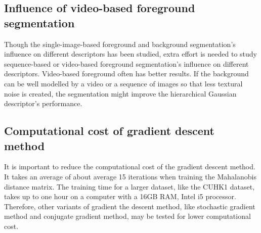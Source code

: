 \subsection{Influence of video-based foreground segmentation}
Though the single-image-based foreground and background segmentation's influence on different descriptors has been studied, extra effort is needed to study sequence-based or video-based foreground segmentation's influence on different descriptors. Video-based foreground often has better results. If the background can be well modelled by a video or a sequence of images so that less textural noise is created, the segmentation might improve the hierarchical Gaussian descriptor's performance.
\subsection{Computational cost of gradient descent method}
It is important to reduce the computational cost of the gradient descent method. It takes an average of about average 15 iterations when training the Mahalanobis distance matrix. The training time for a larger dataset, like the CUHK1 dataset, takes up to one hour on a computer with a 16GB RAM, Intel i5 processor. Therefore, other variants of gradient the descent method, like stochastic gradient method and conjugate gradient method, may be tested for lower computational cost.



